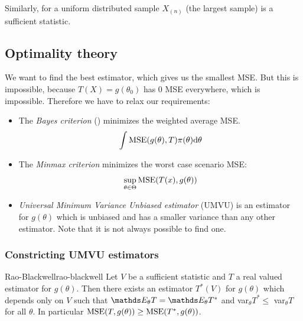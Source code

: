 \documentclass[12pt]{extarticle}
\begin{document}
Similarly, for a uniform distributed sample $X_{(n)}$ (the largest sample) is a sufficient statistic.

\subsection{Optimality theory}

We want to find the best estimator, which gives us the smallest MSE.
But this is impossible, because $T(X) = g(\theta_0)$ has 0 MSE everywhere, which is impossible.
Therefore we have to relax our requirements:
\begin{itemize}
	\item The \emph{Bayes criterion} () minimizes the weighted average MSE.
	      \begin{equation}
		      \int \MSE(g(\theta), T) \pi(\theta) \dd \theta
	      \end{equation}
	\item The \emph{Minmax criterion} minimizes the worst case scenario MSE:
	      \begin{equation}
		      \sup_{\theta \in \Theta} \MSE(T(x), g(\theta))
	      \end{equation}
	\item \emph{Universal Minimum Variance Unbiased estimator} (UMVU) is an estimator for $g(\theta)$
	      which is unbiased and has a smaller variance than any other estimator.
	      Note that it is not always possible to find one.
\end{itemize}

\subsubsection{Constricting UMVU estimators}

\begin{theorem}{Rao-Blackwell}{rao-blackwell}
	Let $V$ be a sufficient statistic and $T$ a real valued estimator for $g(\theta)$.
	Then there exists an estimator $T^*(V)$ for $g(\theta)$ which depends only on $V$ such that
	$\E_\theta T = \E_\theta T^*$ and var$_\theta T^* \leq$ var$_\theta T$ for all $\theta$.
	In particular $\MSE(T, g(\theta)) \geq \MSE(T^*, g(\theta))$.
\end{theorem}
\end{document}
